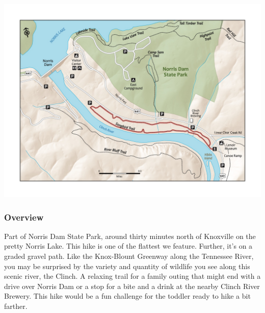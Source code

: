 \documentclass[
  letterpaper,
  DIV=11,
  numbers=noendperiod]{scrartcl}
\begin{document}
\includegraphics{maps/trail-11-map.jpeg}

\hypertarget{overview-10}{%
\subsubsection{Overview}\label{overview-10}}

Part of Norris Dam State Park, around thirty minutes north of Knoxville
on the pretty Norris Lake. This hike is one of the flattest we feature.
Further, it's on a graded gravel path. Like the Knox-Blount Greenway
along the Tennessee River, you may be surprised by the variety and
quantity of wildlife you see along this scenic river, the Clinch. A
relaxing trail for a family outing that might end with a drive over
Norris Dam or a stop for a bite and a drink at the nearby Clinch River
Brewery. This hike would be a fun challenge for the toddler ready to
hike a bit farther.
\end{document}
